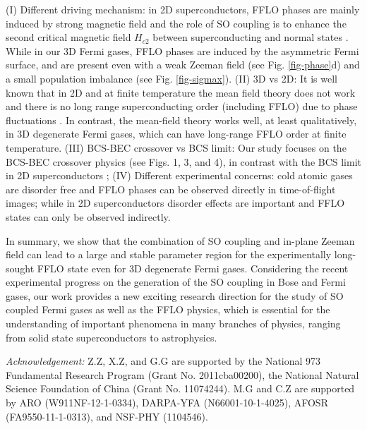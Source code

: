 \documentclass[prl,showpacs,twocolumn]{revtex4}
\begin{document}
(I) Different driving mechanism: in 2D superconductors, FFLO phases are
mainly induced by strong magnetic field and the role of SO coupling is to
enhance the second critical magnetic field $H_{c2}$ between superconducting and
normal states \cite{2DSC1,2DSC2}. While in our 3D Fermi gases, FFLO phases
are induced by the asymmetric Fermi surface, and are present even with a
weak Zeeman field (see Fig. \ref{fig-phase}d) and a small population
imbalance (see Fig. \ref{fig-sigmax}). (II) 3D vs 2D: It is well known that
in 2D and at finite temperature the mean field theory does not work and
there is no long range superconducting order (including FFLO) due to phase
fluctuations \cite{BKT1,BKT2,BKT3}. In contrast, the mean-field theory works
well, at least qualitatively, in 3D degenerate Fermi gases, which can have
long-range FFLO order at finite temperature. (III) BCS-BEC crossover vs BCS
limit: Our study focuses on the BCS-BEC crossover physics (see Figs. 1, 3,
and 4), in contrast with the BCS limit in 2D superconductors \cite%
{2DSC1,2DSC2,2DSC3}; (IV) Different experimental concerns: cold atomic gases
are disorder free and FFLO phases can be observed directly in time-of-flight
images; while in 2D superconductors disorder effects are important \cite%
{2DSC2} and FFLO states can only be observed indirectly.

In summary, we show that the combination of SO coupling and in-plane Zeeman
field can lead to a large and stable parameter region for the experimentally
long-sought FFLO state even for 3D degenerate Fermi gases. Considering the
recent experimental progress on the generation of the SO coupling in Bose
and Fermi gases, our work provides a new exciting research direction for the
study of SO coupled Fermi gases as well as the FFLO physics, which is
essential for the understanding of important phenomena in many branches of
physics, ranging from solid state superconductors to astrophysics.

\textit{Acknowledgement:} Z.Z, X.Z, and G.G are supported by the National
973 Fundamental Research Program (Grant No. 2011cba00200), the National
Natural Science Foundation of China (Grant No. 11074244). M.G and C.Z are
supported by ARO (W911NF-12-1-0334), DARPA-YFA (N66001-10-1-4025), AFOSR
(FA9550-11-1-0313), and NSF-PHY (1104546).
\end{document}
